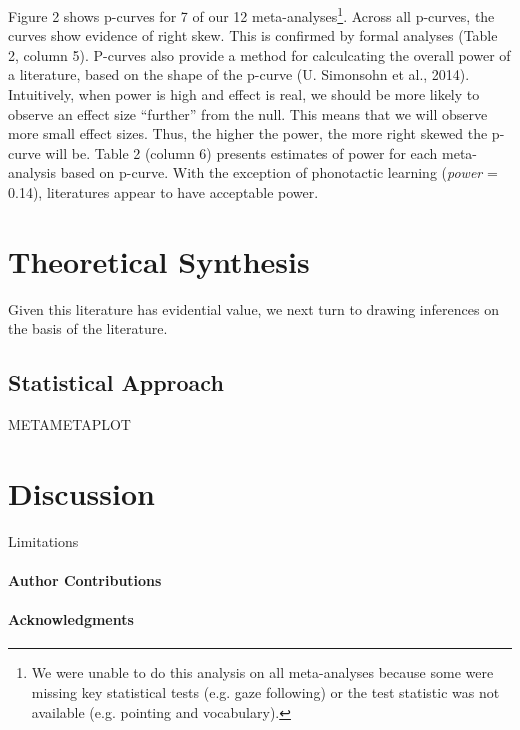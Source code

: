 \documentclass[american,floatsintext,man]{apa6}
\newcounter{author}
\begin{document}
Figure 2 shows p-curves for 7 of our 12
meta-analyses\footnote{We were unable to do this analysis on all meta-analyses because some were missing key statistical tests (e.g. gaze following) or the test statistic was not available (e.g. pointing and vocabulary).}.
Across all p-curves, the curves show evidence of right skew. This is
confirmed by formal analyses (Table 2, column 5). P-curves also provide
a method for calculcating the overall power of a literature, based on
the shape of the p-curve (U. Simonsohn et al., 2014). Intuitively, when
power is high and effect is real, we should be more likely to observe an
effect size \enquote{further} from the null. This means that we will
observe more small effect sizes. Thus, the higher the power, the more
right skewed the p-curve will be. Table 2 (column 6) presents estimates
of power for each meta-analysis based on p-curve. With the exception of
phonotactic learning (\emph{power} = 0.14), literatures appear to have
acceptable power.

\section{Theoretical Synthesis}\label{theoretical-synthesis}

Given this literature has evidential value, we next turn to drawing
inferences on the basis of the literature.

\subsection{Statistical Approach}\label{statistical-approach}

METAMETAPLOT

\section{Discussion}\label{discussion}

Limitations

\paragraph{Author Contributions}\label{author-contributions}

\paragraph{Acknowledgments}\label{acknowledgments}

\newpage
\end{document}
